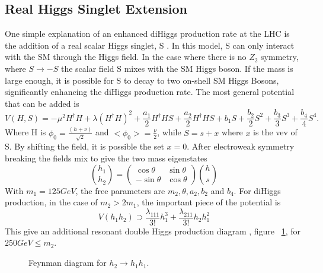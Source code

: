 \subsection{Real Higgs Singlet Extension}
One simple explanation of an enhanced diHiggs production rate at the LHC is the addition of a real scalar Higgs singlet, S \cite{Lewis:2017dme}. In this model, S can only interact with the SM through the Higgs field. In the case where there is no ${Z_{2}}$ symmetry, where ${S\rightarrow -S}$ the scalar field S mixes with the SM Higgs boson. If the mass is large enough, it is possible for S to decay to two on-shell SM Higgs Bosons, significantly enhancing the diHiggs production rate.\newline
\indent The most general potential that can be added is 
\begin{equation}
V(H,S) = -\mu^{2}H^{\dagger}H + \lambda(H^{\dagger}H)^{2} + \frac{a_{1}}{2}H^{\dagger}HS + \frac{a_{2}}{2}H^{\dagger}HS + b_{1}S + \frac{b_{2}}{2}S^{2} + \frac{b_{3}}{3}S^{3} + \frac{b_{4}}{4}S^{4}.
\end{equation}
Where H is ${\phi_{0} = \frac{(h + \nu)}{\sqrt{2}}}$ and ${<\phi_{0}> = \frac{\nu}{2}}$, while ${S = s + x}$ where ${x}$ is the vev of S. By shifting the field, it is possible the set ${x = 0}$. After electroweak symmetry breaking the fields mix to give the two mass eigenstates
\begin{equation}
\binom{h_{1}}{h_{2}} = 
\begin{pmatrix}
\cos{\theta} & \sin{\theta}\\
-\sin{\theta} & \cos{\theta}
\end{pmatrix}
\binom{h}{s}
\end{equation}
With ${m_{1} = 125 GeV}$, the free parameters are ${m_{2}, \theta,a_{2},b_{2}}$ and ${b_{4}}$. For diHiggs production, in the case of ${m_{2}>2m_{1}}$, the important piece of the potential is 
\begin{equation}
V(h_{1}h_{2}) \supset \frac{\lambda_{111}}{3!}h_{1}^{3} + \frac{\lambda_{211}}{3!}h_{2}h_{1}^{2}
\end{equation}
This give an additional resonant double Higgs production diagram , figure ~\ref{fig:FeyRes}, for ${250 GeV \leq m_{2}}$.
\begin{figure}[h]
\begin{center}
\caption{Feynman diagram for ${h_{2}\rightarrow h_{1}h_{1}}$.}
\label{fig:FeyRes}
\end{center}
\end{figure}

